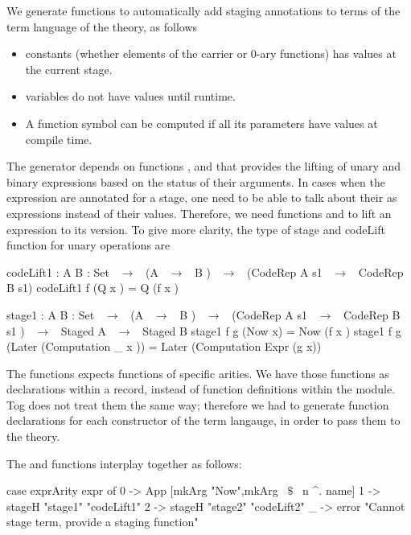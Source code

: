 We generate functions to automatically add staging annotations to terms of the term language of the theory, as follows
\begin{itemize}
\item constants (whether elements of the carrier or $0$-ary functions) has values at the current stage. 
\item variables do not have values until runtime. 
\item A function symbol can be computed if all its parameters have values at compile time. 
\end{itemize}
The generator depends on functions , and  that provides the lifting of unary and binary expressions based on the status of their arguments. In cases when the expression are annotated for a  stage, one need to be able to talk about their  as expressions instead of their values. Therefore, we need functions  and  to lift an expression to its  version. To give more clarity, the type of stage and codeLift function for unary operations are 
\begin{togcode} 
codeLift1 : {A B  : Set }  ~$\to$~ (A  ~$\to$~ B )  ~$\to$~ 
                       (CodeRep A s1 ~$\to$~ CodeRep B s1)
codeLift1 f (Q x )  = Q (f x )

stage1 : {A B  : Set } ~$\to$~ (A ~$\to$~ B ) ~$\to$~ 
                       (CodeRep A s1 ~$\to$~ CodeRep B s1 ) ~$\to$~ 
                       Staged A ~$\to$~ Staged B
stage1 f g (Now x)  = Now (f x )
stage1 f g (Later (Computation _ x ))  =  Later (Computation Expr (g x))
\end{togcode} 

The  functions expects functions of specific arities. We have those functions as declarations within a record, instead of function definitions within the module. Tog does not treat them the same way; therefore we had to generate function declarations for each constructor of the term langauge, in order to pass them to the theory. 

The  and  functions interplay together as follows: 
\begin{hscode} 
case exprArity expr of
  0 -> App [mkArg "Now",mkArg ~$\$$~ n ^. name]
  1 -> stageH "stage1" "codeLift1"
  2 -> stageH "stage2" "codeLift2"
  _ -> error "Cannot stage term, provide a staging function" 
\end{hscode} 

